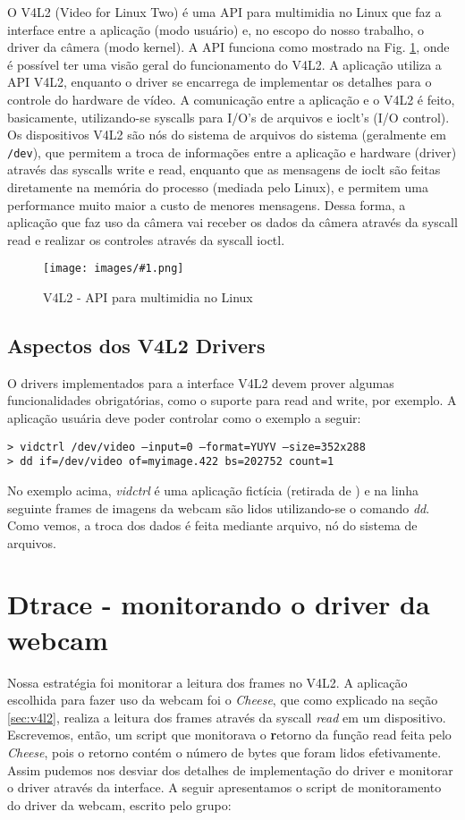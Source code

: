 \documentclass[a4paper]{scrartcl}
\newcommand{\Fig}[2]{
\begin{figure}
        \centering
        \texttt{[image: images/\#1.png]}
        \caption{#2}
        \label{fig:#1}
\end{figure}}
\begin{document}
O V4L2 (Video for Linux Two) é uma API para multimidia no Linux que faz a interface entre a aplicação (modo usuário) e, no escopo do nosso trabalho, o driver da câmera (modo kernel). A API funciona como mostrado na Fig. \ref{fig:v4l2}, onde é possível ter uma visão geral do funcionamento do V4L2. A aplicação utiliza a API V4L2, enquanto o driver se encarrega de implementar os detalhes para o controle do hardware de vídeo. A comunicação entre a aplicação e o V4L2 é feito, basicamente, utilizando-se syscalls para I/O's de arquivos e ioclt's (I/O control). Os dispositivos V4L2 são nós do sistema de arquivos do sistema (geralmente em {\tt /dev}), que permitem a troca de informações entre a aplicação e hardware (driver) através das syscalls write e read, enquanto que as mensagens de ioclt são feitas diretamente na memória do processo (mediada pelo Linux), e permitem uma performance muito maior a custo de menores mensagens. Dessa forma, a aplicação que faz uso da câmera vai receber os dados da câmera através da syscall read e realizar os controles através da syscall ioctl. 

\Fig{v4l2}{V4L2 - API para multimidia no Linux}

\subsection{Aspectos dos V4L2 Drivers}

O drivers implementados para a interface V4L2 devem prover algumas funcionalidades obrigatórias, como o suporte para read and write, por exemplo. A aplicação usuária deve poder controlar como o exemplo a seguir:

\begin{center}
{\tt > vidctrl /dev/video --input=0 --format=YUYV --size=352x288} \\
{\tt > dd if=/dev/video of=myimage.422 bs=202752 count=1}
\end{center}

No exemplo acima, \emph{vidctrl} é uma aplicação fictícia (retirada de \cite{tese}) e na linha seguinte frames de imagens da webcam são lidos utilizando-se o comando \emph{dd}. Como vemos, a troca dos dados é feita mediante arquivo, nó do sistema de arquivos.

\section{Dtrace - monitorando o driver da webcam}

Nossa estratégia foi monitorar a leitura dos frames no V4L2. A aplicação escolhida para fazer uso da webcam foi o \emph{Cheese}, que como explicado na seção \ref{sec:v4l2}, realiza a leitura dos frames através da syscall \emph{read} em um dispositivo. Escrevemos, então, um script que monitorava o {\textbf retorno} da função read feita pelo \emph{Cheese}, pois o retorno contém o número de bytes que foram lidos efetivamente. Assim pudemos nos desviar dos detalhes de implementação do driver e monitorar o driver através da interface. A seguir apresentamos o script de monitoramento do driver da webcam, escrito pelo grupo:
\end{document}

